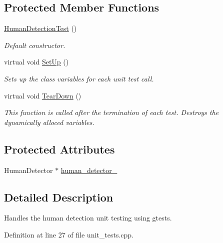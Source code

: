 \subsection*{Protected Member Functions}
\begin{DoxyCompactItemize}
\item 
\hyperlink{classHumanDetectionTest_a3c57e54c0bd3bdcd1d3835463d1cb3a7}{Human\-Detection\-Test} ()
\begin{DoxyCompactList}\small\item\em Default constructor. \end{DoxyCompactList}\item 
virtual void \hyperlink{classHumanDetectionTest_a2f61d8cd6c5e18e3f52440f95f3746f7}{Set\-Up} ()
\begin{DoxyCompactList}\small\item\em Sets up the class variables for each unit test call. \end{DoxyCompactList}\item 
virtual void \hyperlink{classHumanDetectionTest_a6cd19bdb532d8cea1292b67ea862db88}{Tear\-Down} ()
\begin{DoxyCompactList}\small\item\em This function is called after the termination of each test. Destroys the dynamically alloced variables. \end{DoxyCompactList}\end{DoxyCompactItemize}
\subsection*{Protected Attributes}
\begin{DoxyCompactItemize}
\item 
Human\-Detector $\ast$ \hyperlink{classHumanDetectionTest_a052710732ae09a580f044ad2a0f1e9fc}{human\-\_\-detector\-\_\-}
\end{DoxyCompactItemize}


\subsection{Detailed Description}
Handles the human detection unit testing using gtests. 

Definition at line 27 of file unit\-\_\-tests.\-cpp.



